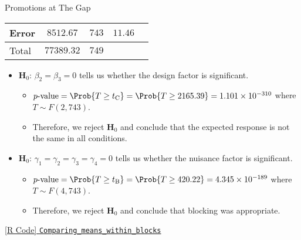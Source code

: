 \begin{Example}{Promotions at The Gap}{}
\begin{center}
\begin{NiceTabular}{|l|c|c|c|c|}
            Error     & $ 8512.67 $  & $ 743 $ & $ 11.46 $    &                        \\
            \midrule
            Total     & $ 77389.32 $ & $ 749 $\\
            \bottomrule
        \end{NiceTabular}
    \end{center}
    \begin{itemize}
        \item $ \mathbf{H}_0 $: $ \beta_2=\beta_3=0 $ tells us whether the design factor is significant.
              \begin{itemize}
                  \item $ p\text{-value}=\Prob{T\ge t_\text{C}}=\Prob{T\ge 2165.39}=1.101\times 10^{-310} $ where $ T \sim F(2,743) $.
                  \item Therefore, we reject $ \mathbf{H}_0 $ and conclude that the expected response is not the same in all conditions.
              \end{itemize}
        \item $ \mathbf{H}_0 $: $ \gamma_1=\gamma_2=\gamma_3=\gamma_4=0 $ tells us whether the nuisance factor is significant.
              \begin{itemize}
                  \item $ p\text{-value}=\Prob{T\ge t_\text{B}}=\Prob{T\ge 420.22}=4.345\times 10^{-189} $ where $ T \sim F(4,743) $.
                  \item Therefore, we reject $ \mathbf{H}_0 $ and conclude that blocking was appropriate.
              \end{itemize}
    \end{itemize}
    \href{https://github.com/Hextical/university-notes/blob/master/year-3/semester-3/STAT 430/code/W5/Comparing_means_within_blocks.R}{[R Code] \texttt{Comparing\_means\_within\_blocks}}
\end{Example}
